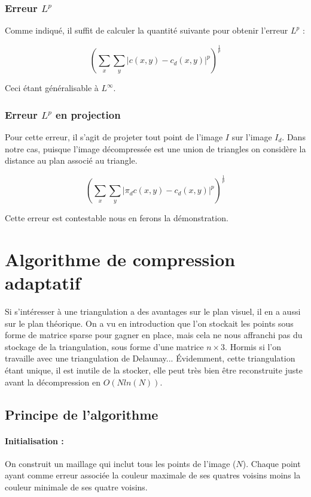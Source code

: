 \documentclass{report}
\begin{document}
\subsubsection{Erreur $L^p$}

Comme indiqué, il suffit de calculer la quantité suivante pour obtenir l'erreur $L^p$ :

$$ (\sum_x \sum_y \vert c(x,y) - c_d(x, y) \vert^p )^{\frac{1}{p}} $$

Ceci étant généralisable à $L^\infty$.

\subsubsection{Erreur $L^p$ en projection}

Pour cette erreur, il s'agit de projeter tout point de l'image $I$ sur l'image $I_d$. Dans notre cas, puisque l'image décompressée est une union de triangles on considère la distance au plan associé au triangle.

$$ (\sum_x \sum_y \vert \pi_d c(x,y) - c_d(x, y) \vert^p )^{\frac{1}{p}} $$

Cette erreur est contestable nous en ferons la démonstration.

\section{Algorithme de compression adaptatif}

Si s'intéresser à une triangulation a des avantages sur le plan visuel, il en a aussi sur le plan théorique. On a vu en introduction que l'on stockait les points sous forme de matrice sparse pour gagner en place, mais cela ne nous affranchi pas du stockage de la triangulation, sous forme d'une matrice $n \times 3$. Hormis si l'on travaille avec une triangulation de Delaunay... Évidemment, cette triangulation étant unique, il est inutile de la stocker, elle peut très bien être reconstruite juste avant la décompression en $O(N ln(N))$.

\subsection{Principe de l'algorithme}

\paragraph{Initialisation :}

On construit un maillage qui inclut tous les points de l'image ($N$). Chaque point ayant comme erreur associée la couleur maximale de ses quatres voisins moins la couleur minimale de ses quatre voisins.
\end{document}
